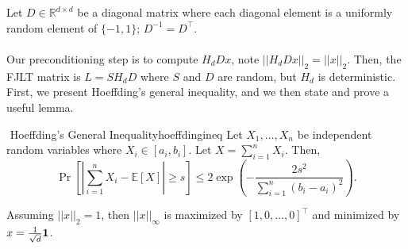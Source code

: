         \vphantom
        \\
        \\
        Let \(D\in\mathbb{R}^{d\times d}\) be a diagonal matrix where each diagonal element is a uniformly random element of \(\{-1,1\}\); \(D^{-1}=D^\top\).
        \\
        \\
        Our preconditioning step is to compute \(H_dDx\), note \(||H_dDx||_2=||x||_2\). Then, the FJLT matrix is \(L=SH_dD\) where \(S\) and \(D\) are random, but \(H_d\) is deterministic. First, we present Hoeffding's general inequality, and we then state and prove a useful lemma.
        \begin{theorem}{\Stop\,\,Hoeffding's General Inequality}{hoeffdingineq}
            Let \(X_1,\ldots,X_n\) be independent random variables where \(X_i\in[a_i,b_i]\). Let \(X=\sum_{i=1}^n X_i\). Then,
            \begin{equation*}
                \Pr\left[\left|\sum_{i=1}^n X_i-\mathbb{E}[X]\right|\geq s \right]\leq 2\exp\left(-\frac{2s^2}{\sum_{i=1}^n (b_i-a_i)^2}\right).
            \end{equation*}
        \end{theorem}
        \begin{remark*}
            Assuming \(||x||_2=1\), then \(||x||_\infty\) is maximized by \([1,0,\ldots,0]^\top\) and minimized by \(x=\frac{1}{\sqrt{d}}\mathbf{1}\).
        \end{remark*}
